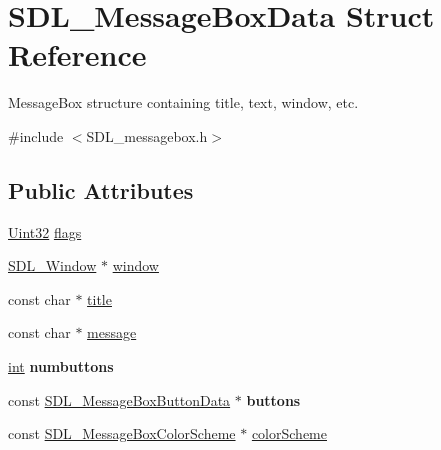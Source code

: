 \hypertarget{struct_s_d_l___message_box_data}{}\section{S\+D\+L\+\_\+\+Message\+Box\+Data Struct Reference}
\label{struct_s_d_l___message_box_data}


Message\+Box structure containing title, text, window, etc.  




{\ttfamily \#include $<$S\+D\+L\+\_\+messagebox.\+h$>$}

\subsection*{Public Attributes}
\begin{DoxyCompactItemize}
\item 
\hyperlink{_s_d_l__stdinc_8h_add440eff171ea5f55cb00c4a9ab8672d}{Uint32} \hyperlink{struct_s_d_l___message_box_data_a113d016f760bf4e4156b0f376358d6a0}{flags}
\item 
\hyperlink{_s_d_l__video_8h_a55a196c7d3b8497538632c79ae1e6392}{S\+D\+L\+\_\+\+Window} $\ast$ \hyperlink{struct_s_d_l___message_box_data_a5c333bc93705c66068e140bc28daedcb}{window}
\item 
const char $\ast$ \hyperlink{struct_s_d_l___message_box_data_a93ceeafeed20b553ad4c86c9be37f117}{title}
\item 
const char $\ast$ \hyperlink{struct_s_d_l___message_box_data_ada6ae208a1f85adabbd7a7a08ca609c8}{message}
\item 
\hypertarget{struct_s_d_l___message_box_data_a133f4fef549cc0cb14b799af35f3dc5a}{}\hyperlink{_s_d_l__thread_8h_a6a64f9be4433e4de6e2f2f548cf3c08e}{int} {\bfseries numbuttons}\label{struct_s_d_l___message_box_data_a133f4fef549cc0cb14b799af35f3dc5a}

\item 
\hypertarget{struct_s_d_l___message_box_data_a265e47aab749e384661ae91d3e11e0db}{}const \hyperlink{struct_s_d_l___message_box_button_data}{S\+D\+L\+\_\+\+Message\+Box\+Button\+Data} $\ast$ {\bfseries buttons}\label{struct_s_d_l___message_box_data_a265e47aab749e384661ae91d3e11e0db}

\item 
const \hyperlink{struct_s_d_l___message_box_color_scheme}{S\+D\+L\+\_\+\+Message\+Box\+Color\+Scheme} $\ast$ \hyperlink{struct_s_d_l___message_box_data_a18744865a3e89e260db5f01aee579e35}{color\+Scheme}
\end{DoxyCompactItemize}


